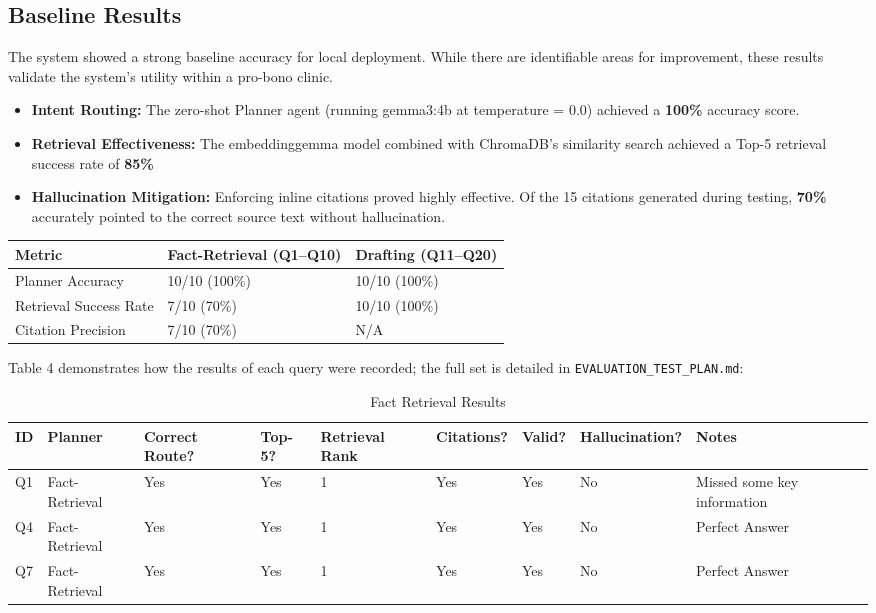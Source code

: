 \documentclass[11pt,a4paper]{article}
\begin{document}
\subsection{Baseline Results}

The system showed a strong baseline accuracy for local deployment. While there are identifiable areas for improvement, these results validate the system's utility within a pro-bono clinic.

\begin{itemize}

\item \textbf{Intent Routing:} The zero-shot Planner agent (running gemma3:4b at temperature = 0.0) achieved a \textbf{100\%} accuracy score.

\item \textbf{Retrieval Effectiveness:} The embeddinggemma model combined with ChromaDB's similarity search achieved a Top-5 retrieval success rate of \textbf{85\%}

\item \textbf{Hallucination Mitigation:} Enforcing inline citations proved highly effective. Of the 15 citations generated during testing, \textbf{70\%} accurately pointed to the correct source text without hallucination. 

\end{itemize}

\begin{table}[!ht]
    \centering
    \begin{tabular}{|l|l|l|}
    \hline
        Metric & Fact-Retrieval (Q1–Q10) & Drafting (Q11–Q20) \\ \hline
        Planner Accuracy & 10/10 (100\%) & 10/10 (100\%) \\ \hline
        Retrieval Success Rate & 7/10 (70\%) & 10/10 (100\%) \\ \hline
        Citation Precision & 7/10 (70\%) & N/A \\ \hline
    \end{tabular}
\end{table}

Table 4 demonstrates how the results of each query were recorded; the full set is detailed in \texttt{EVALUATION\_TEST\_PLAN.md}:

    \begin{table}[H]
    \centering
    \begin{tabularx}{\textwidth}{|l|l|X|X|X|X|X|X|X|}
    \hline
      ID & Planner & Correct Route? & Top-5? & Retrie\-val Rank & Cita\-tions? & Valid? & Hal\-lu\-ci\-na\-tion? & Notes \\ \hline
        Q1 & Fact-Retrieval & Yes & Yes & 1 & Yes & Yes & No & Missed some key information \\ \hline
        Q4 & Fact-Retrieval & Yes & Yes & 1 & Yes & Yes & No & Perfect Answer \\ \hline
        Q7 & Fact-Retrieval & Yes & Yes & 1 & Yes & Yes & No & Perfect Answer \\ \hline
    \end{tabularx}

    \caption{Fact Retrieval Results}
    \end{table}
\end{document}
